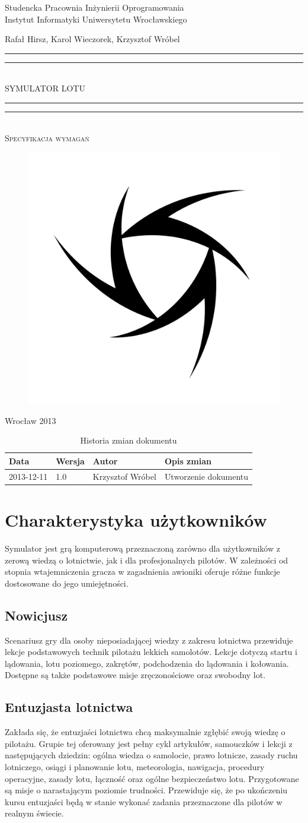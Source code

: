 \documentclass{mwrep}
\newcommand*{\titleGP}{\begingroup
\centering

{\large Studencka Pracownia Inżynierii Oprogramowania}\\Instytut Informatyki Uniwersytetu Wrocławskiego\par
\vspace*{16\baselineskip}

{\Large Rafał Hirsz, Karol Wieczorek, Krzysztof Wróbel\par}
\vspace*{\baselineskip}

\rule{\textwidth}{1.6pt}\vspace*{-\baselineskip}\vspace*{2pt}
\rule{\textwidth}{0.4pt}\\[\baselineskip]

{\Huge SYMULATOR LOTU}\\[0.2\baselineskip]

\rule{\textwidth}{0.4pt}\vspace*{-\baselineskip}\vspace{3.2pt}
\rule{\textwidth}{1.6pt}\\[\baselineskip]

\scshape
{\huge Specyfikacja wymagań}\par
\vspace*{2\baselineskip}

\begin{figure}[h]
\centering
\includegraphics[width=5\baselineskip]{flightsim-team-logo.pdf}
\end{figure}
\vfill

{\large Wrocław 2013}\par

\pagebreak

\endgroup}
\begin{document}
\thispagestyle{empty}
\titleGP

\begin{center}
\begin{table}[h]
\begin{center}
\begin{tabularx}{1\textwidth}{|l|l|l|X|}
\hline
Data & Wersja & Autor & Opis zmian \\ \hline
2013-12-11 & 1.0 & Krzysztof Wróbel & Utworzenie dokumentu \\
\hline
\end{tabularx}
\end{center}
\vspace{3ex}
\caption{Historia zmian dokumentu}\label{T:Zmiany}
\end{table}
\end{center}

\pagebreak

\tableofcontents

\chapter{Charakterystyka użytkowników}

Symulator jest grą komputerową przeznaczoną zarówno dla użytkowników z zerową wiedzą o lotnictwie, jak i dla profesjonalnych pilotów. W zależności od stopnia wtajemniczenia gracza w zagadnienia awioniki oferuje różne funkcje dostosowane do jego umiejętności.

\section{Nowicjusz}

Scenariusz gry dla osoby nieposiadającej wiedzy z zakresu lotnictwa przewiduje lekcje podstawowych technik pilotażu lekkich samolotów. Lekcje dotyczą startu i lądowania, lotu poziomego, zakrętów, podchodzenia do lądowania i kołowania. Dostępne są także podstawowe misje zręczonościowe oraz swobodny lot.

\section{Entuzjasta lotnictwa}

Zakłada się, że entuzjaści lotnictwa chcą maksymalnie zgłębić swoją wiedzę o pilotażu. Grupie tej oferowany jest pełny cykl artykułów, samouczków i lekcji z następujących dziedzin: ogólna wiedza o samolocie, prawo lotnicze, zasady ruchu lotniczego, osiągi i planowanie lotu, meteorologia, nawigacja, procedury operacyjne, zasady lotu, łączność oraz ogólne bezpieczeństwo lotu. Przygotowane są misje o narastającym poziomie trudności. Przewiduje się, że po ukończeniu kursu entuzjaści będą w stanie wykonać zadania przeznaczone dla pilotów w realnym świecie.
\end{document}

